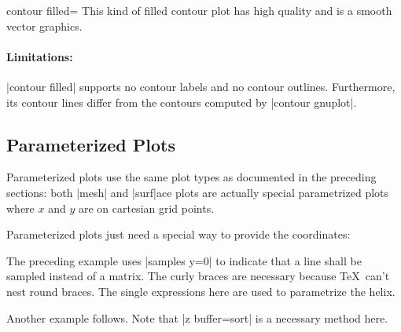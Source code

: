{{\begin{plottype}[/pgfplots]{contour filled=\textcolor{black}{}}
This kind of filled contour plot has high quality and is a smooth vector graphics.

\paragraph{Limitations:} |contour filled| supports no contour labels and no contour outlines. Furthermore, its contour lines differ from the contours computed by |contour gnuplot|.

\end{plottype}
}%



\subsection{Parameterized Plots}
{%
%
Parameterized plots use the same plot types as documented in the preceding sections: both |mesh| and |surf|ace plots are actually special parametrized plots where $x$ and $y$ are on cartesian grid points.

Parameterized plots just need a special way to provide the coordinates:

\pgfplotsexpensiveexample
\begin{codeexample}[]
\end{codeexample}
\noindent The preceding example uses |samples y=0| to indicate that a line shall be sampled instead of a matrix. The curly braces are necessary because \TeX\ can't nest round braces. The single expressions here are used to parametrize the helix.

Another example follows. Note that |z buffer=sort| is a necessary method here.

\pgfplotsexpensiveexample
\begin{codeexample}[]
\end{codeexample}

}}
